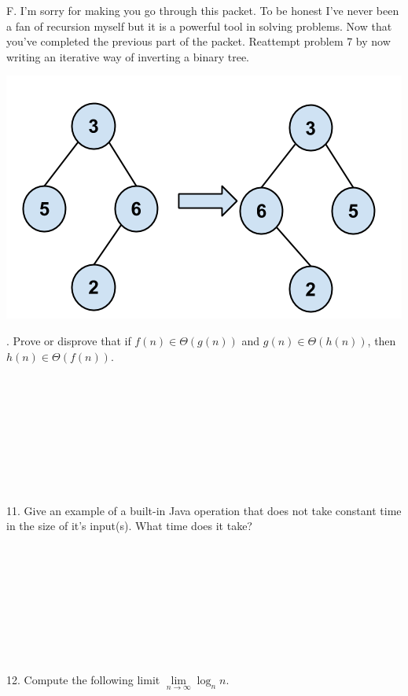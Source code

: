 \documentclass[12pt]{article}
\begin{document}
\newpage
\noindent F. I'm sorry for making you go through this packet. To be honest I've never been a fan of recursion myself but it is a powerful tool in solving problems. Now that you've completed the previous part of the packet. Reattempt problem 7 by now writing an iterative way of inverting a binary tree.
\centerline{\includegraphics[scale = 0.4]{invertbtree.png}}
\newpage 
{}. Prove or disprove that if $f(n) \in \Theta(g(n))$ and $g(n) \in \Theta(h(n))$, then $h(n) \in \Theta(f(n))$.\\\\\\\\\\\\\\\\\\\\
11. Give an example of a built-in Java operation that does not take constant time in the size of it's input(s). What time does it take?\\\\\\\\\\\\\\\\\\\\
12. Compute the following limit $\lim\limits_{n\to\infty}\log_{n}{n}$.
\end{document}
